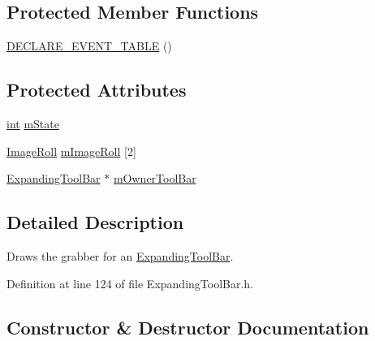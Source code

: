 \subsection*{Protected Member Functions}
\begin{DoxyCompactItemize}
\item 
\hyperlink{class_tool_bar_grabber_adb9746bf3132805da693baff51e53df8}{D\+E\+C\+L\+A\+R\+E\+\_\+\+E\+V\+E\+N\+T\+\_\+\+T\+A\+B\+LE} ()
\end{DoxyCompactItemize}
\subsection*{Protected Attributes}
\begin{DoxyCompactItemize}
\item 
\hyperlink{xmltok_8h_a5a0d4a5641ce434f1d23533f2b2e6653}{int} \hyperlink{class_tool_bar_grabber_aa0dd84a915732171fcdcac179382c1e1}{m\+State}
\item 
\hyperlink{class_image_roll}{Image\+Roll} \hyperlink{class_tool_bar_grabber_a3f4ffb1f9d62dda1258fc98548b43c86}{m\+Image\+Roll} \mbox{[}2\mbox{]}
\item 
\hyperlink{class_expanding_tool_bar}{Expanding\+Tool\+Bar} $\ast$ \hyperlink{class_tool_bar_grabber_af538a5b6d82ea49b5fa368a70bc04c66}{m\+Owner\+Tool\+Bar}
\end{DoxyCompactItemize}


\subsection{Detailed Description}
Draws the grabber for an \hyperlink{class_expanding_tool_bar}{Expanding\+Tool\+Bar}. 

Definition at line 124 of file Expanding\+Tool\+Bar.\+h.



\subsection{Constructor \& Destructor Documentation}
